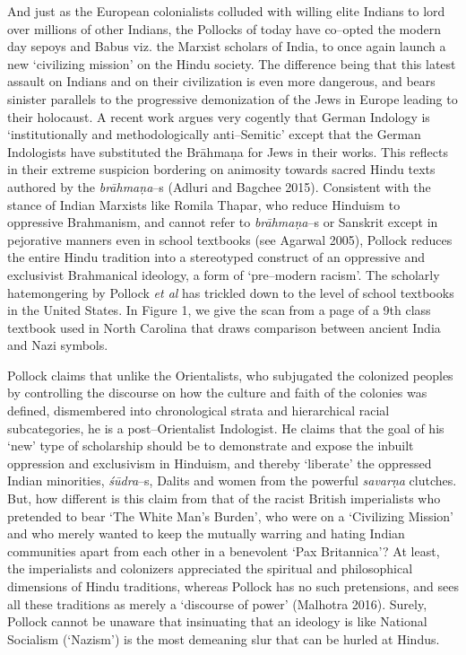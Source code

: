 And just as the European colonialists colluded with willing elite Indians to lord over millions of other Indians, the Pollocks of today have co–opted the modern day sepoys and Babus viz. the Marxist scholars of India, to once again launch a new ‘civilizing mission’ on the Hindu society. The difference being that this latest assault on Indians and on their civilization is even more dangerous, and bears sinister parallels to the progressive demonization of the Jews in Europe leading to their holocaust. A recent work argues very cogently that German Indology is ‘institutionally and methodologically anti–Semitic’ except that the German Indologists have substituted the Brāhmaṇa for Jews in their works. This reflects in their extreme suspicion bordering on animosity towards sacred Hindu texts authored by the \textit{brāhmaṇa}–s (Adluri and Bagchee 2015). Consistent with the stance of Indian Marxists like Romila Thapar, who reduce Hinduism to oppressive Brahmanism, and cannot refer to \textit{brāhmaṇa}–s or Sanskrit except in pejorative manners even in school textbooks (see Agarwal 2005), Pollock reduces the entire Hindu tradition into a stereotyped construct of an oppressive and exclusivist Brahmanical ideology, a form of ‘pre–modern racism’. The scholarly hatemongering by Pollock \textit{et al} has trickled down to the level of school textbooks in the United States. In Figure 1, we give the scan from a page of a 9th class textbook used in North Carolina that draws comparison between ancient India and Nazi symbols.

Pollock claims that unlike the Orientalists, who subjugated the colonized peoples by controlling the discourse on how the culture and faith of the colonies was defined, dismembered into chronological strata and hierarchical racial subcategories, he is a post–Orientalist Indologist. He claims that the goal of his ‘new’ type of scholarship should be to demonstrate and expose the inbuilt oppression and exclusivism in Hinduism, and thereby ‘liberate’ the oppressed Indian minorities, \textit{śūdra}–s, Dalits and women from the powerful \textit{savarṇa} clutches. But, how different is this claim from that of the racist British imperialists who pretended to bear ‘The White Man’s Burden’, who were on a ‘Civilizing Mission’ and who merely wanted to keep the mutually warring and hating Indian communities apart from each other in a benevolent ‘Pax Britannica’? At least, the imperialists and colonizers appreciated the spiritual and philosophical dimensions of Hindu traditions, whereas Pollock has no such pretensions, and sees all these traditions as merely a ‘discourse of power’ (Malhotra 2016). Surely, Pollock cannot be unaware that insinuating that an ideology is like National Socialism (‘Nazism’) is the most demeaning slur that can be hurled at Hindus.

